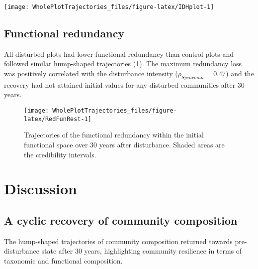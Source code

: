 \documentclass[fleqn,10pt]{ArtEcoFoG} %
\begin{document}
\begin{figure*}

{\centering \texttt{[image: WholePlotTrajectories\_files/figure-latex/IDHplot-1]} 

}

\caption{Relationship between the initial \%AGB loss and community taxonomic richness \textbf{(a)}, taxonomic evenness \textbf{(b)}, functional richness \textbf{(c)},and functional evenness \textbf{(d)} at 10, 20 and 30 years after disturbance}\label{fig:IDHplot}
\end{figure*}

\subsection{Functional redundancy}\label{functional-redundancy}

All disturbed plots had lower functional redundancy than control plots
and followed similar hump-shaped trajectories (\ref{fig:RedFunRest}).
The maximum redundancy loss was positively correlated with the
disturbance intensity (\(\rho_{Spearman}=0.47\)) and the recovery had
not attained initial values for any disturbed communities after 30
years.

\begin{figure}

{\centering \texttt{[image: WholePlotTrajectories\_files/figure-latex/RedFunRest-1]} 

}

\caption{Trajectories of the functional redundancy within the initial functional space over 30 years after disturbance. Shaded areas are the credibility intervals.}\label{fig:RedFunRest}
\end{figure}

\section{Discussion}\label{discussion}

\subsection{A cyclic recovery of community
composition}\label{a-cyclic-recovery-of-community-composition}

The hump-shaped trajectories of community composition returned towards
pre-disturbance state after 30 years, highlighting community resilience
in terms of taxonomic and functional composition.
\end{document}
